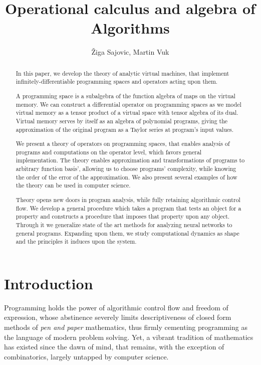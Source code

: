 \documentclass{article}
\title{Operational calculus and algebra of Algorithms}
\author{\v{Z}iga Sajovic, Martin Vuk}
\begin{document}
\maketitle
\begin{abstract}
In this paper, we develop the theory of analytic virtual machines, that
implement infinitely-differentiable programming spaces and operators acting upon them.

A programming space is a subalgebra of the function algebra of maps on the virtual
memory. We can construct a differential operator on programming spaces as we 
model virtual memory as a tensor product of a virtual space with tensor algebra
of its dual. Virtual memory serves by itself as an algebra of polynomial
programs, giving the approximation of the original program as a Taylor series at
program's input values. 

We present a theory of operators on programming spaces, that enables analysis of programs
and computations on the operator level, which favors general implementation. The theory enables
approximation and transformations of programs to arbitrary function basis', allowing us to choose programs' complexity, 
while knowing the order of the error of the approximation. We
also present several examples of how the theory can be used in computer science.

Theory opens new doors in program analysis, while fully retaining algorithmic control flow. We develop a general
procedure which takes a program that tests an object for a property and
constructs a procedure that imposes that property upon any object. Through it we generalize state of the art methods for analyzing neural networks to general programs. Expanding upon them, we study computational dynamics as shape and the principles it induces upon the system.

\end{abstract}

\section{Introduction}
Programming holds the power of algorithmic control flow and freedom of expression, whose abstinence severely limits descriptiveness of closed form methods of \textit{pen and paper} mathematics, thus firmly cementing programming as the language of modern problem solving. Yet, a vibrant tradition of mathematics has existed since the dawn of mind, that remains, with the exception of combinatorics, largely untapped by computer science. 
\end{document}
